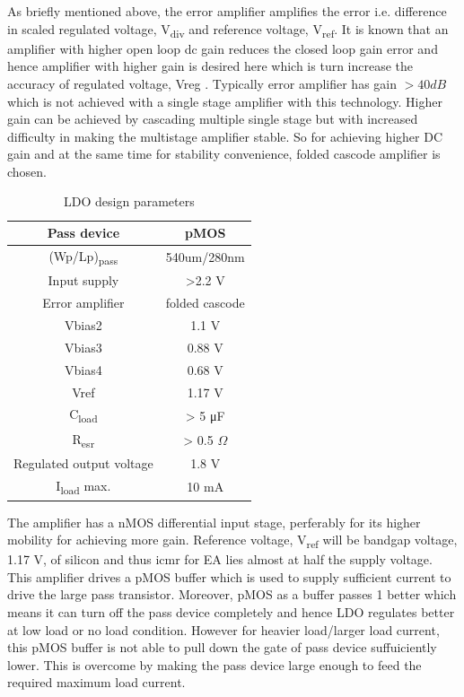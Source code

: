 \documentclass[12pt,a4paper,UKenglish]{article}
\begin{document}
As briefly mentioned above, the error amplifier amplifies the error i.e. difference in scaled regulated voltage, 
V\textsubscript{div} and reference voltage, V\textsubscript{ref}. It is known that an amplifier with higher 
open loop \acrshort{dc} gain reduces the closed loop gain error and hence amplifier with higher gain is desired 
here which is turn increase the accuracy of regulated voltage, Vreg \cite{ldo_bulkmod}. Typically error amplifier 
has gain $> 40 dB$ which is not achieved with a single stage amplifier with this technology. Higher gain can be 
achieved by cascading multiple single stage but with increased difficulty in making the multistage
amplifier stable. So for achieving higher DC gain and at the same time for stability convenience, folded cascode 
amplifier \cite[pp. xx]{razavi_2001} is chosen. \\

\begin{table}[H]
\caption{LDO design parameters}
\begin{center}
\begin{tabular}{c|c}
\hline \hline
Pass device				& pMOS \\ \hline
(Wp/Lp)\textsubscript{pass} 	& 540um/280nm \\ \hline
Input supply 				& >2.2 V \\ \hline
Error amplifier				& folded cascode \\ \hline
Vbias2 					& 1.1 V \\ \hline
Vbias3					& 0.88 V \\ \hline
Vbias4					& 0.68 V \\ \hline
Vref						& 1.17 V \\ \hline
C\textsubscript{load} 		& > 5 \si{\micro\farad}  \\ \hline
R\textsubscript{esr} 	 		& > 0.5 $\Omega$ \\ \hline
Regulated output voltage 		& 1.8 V \\ \hline
I\textsubscript{load} max. 		& 10 mA \\
\hline \hline
\end{tabular}
\end{center}
\label{tab:ldo_parameter}
\end{table}


The amplifier has a nMOS differential input stage, perferably for its higher mobility for achieving more gain.
Reference voltage, V\textsubscript{ref} will be bandgap voltage, 1.17 V, of silicon and  thus \acrshort{icmr} 
for EA lies almost at half the supply voltage. This amplifier drives a pMOS buffer which is used to supply 
sufficient current to drive the large pass transistor. Moreover, pMOS as a buffer passes 1 better which means 
it can turn off the pass device completely and hence LDO regulates better at low load or no load condition. 
However for heavier load/larger load current, this pMOS buffer is not able to pull down the gate of pass device 
suffuiciently lower. This is overcome by making the pass device large enough to feed the required  maximum 
load current.\\
\end{document}

